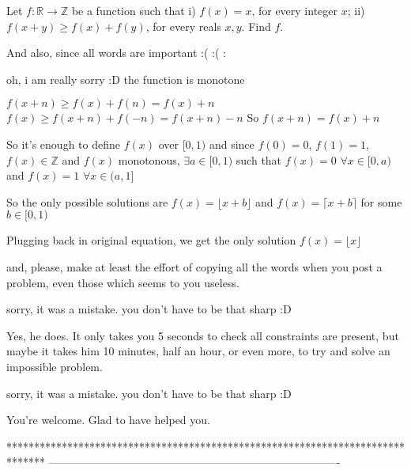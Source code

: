 \begin{solution}
	\begin{tcolorbox}Let $f:\mathbb{R} \rightarrow \mathbb{Z}$ be a function such that
i) $f(x)=x$, for every integer $x$;
ii) $f(x+y) \ge f(x)+f(y)$, for every reals $x,y$.
Find $f$.\end{tcolorbox}
And also, since all words are important :(  :(  :
\begin{tcolorbox}oh, i am really sorry :D the function is monotone\end{tcolorbox}
$f(x+n)\ge f(x)+f(n)=f(x)+n$
$f(x)\ge f(x+n)+f(-n)=f(x+n)-n$
So $f(x+n)=f(x)+n$

So it's enough to define $f(x)$ over $[0,1)$ and since $f(0)=0$, $f(1)=1$, $f(x)\in\mathbb Z$ and $f(x)$ monotonous, $\exists  a\in[0,1)$ such that $f(x)=0$  $\forall x\in[0,a)$ and $f(x)=1$ $\forall x\in(a,1]$

So the only possible solutions are $f(x)=\lfloor x+b\rfloor$ and $f(x)=\lceil x+b\rceil$ for some $b\in[0,1)$

Plugging back in original equation, we get the only solution $\boxed{f(x)=\lfloor x\rfloor}$

and, please, make at least the effort of copying all the words when you post a problem, even those which seems to you useless.
\end{solution}



\begin{solution}
	sorry, it was a mistake. you don't have to be that sharp :D
\end{solution}



\begin{solution}
	Yes, he does. It only takes you 5 seconds to check all constraints are present, but maybe it takes him 10 minutes, half an hour, or even more, to try and solve an impossible problem.
\end{solution}



\begin{solution}
	\begin{tcolorbox}sorry, it was a mistake. you don't have to be that sharp :D\end{tcolorbox}
You're welcome. Glad to have helped you.
\end{solution}
*******************************************************************************
-------------------------------------------------------------------------------

